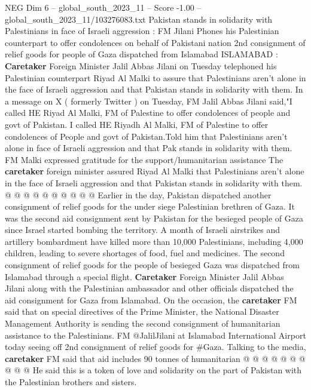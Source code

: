 \begin{textsample}{NEG Dim 6 – global\_south\_2023\_11 – Score -1.00 – global\_south\_2023\_11/103276083.txt}  \label{ex:f6_neg_151}
Pakistan stands in solidarity with Palestinians in face of Israeli aggression : FM Jilani Phones his Palestinian counterpart to offer condolences on behalf of Pakistani nation 2nd consignment of relief goods for people of Gaza dispatched from Islamabad ISLAMABAD : \textbf{Caretaker} Foreign Minister Jalil Abbas Jilani on Tuesday telephoned his Palestinian counterpart Riyad Al Malki to assure that Palestinians aren't alone in the face of Israeli aggression and that Pakistan stands in solidarity with them.
In a message on X ( formerly Twitter ) on Tuesday, FM Jalil Abbas Jilani said,"I called HE Riyad Al Malki, FM of Palestine to offer condolences of people and govt of Pakistan.
I called HE Riyadh Al Malki, FM of Palestine to offer condolences of People and govt of Pakistan.Told him that Palestinians aren't alone in face of Israeli aggression and that Pak stands in solidarity with them.
FM Malki expressed gratitude for the support/humanitarian assistance The \textbf{caretaker} foreign minister assured Riyad Al Malki that Palestinians aren't alone in the face of Israeli aggression and that Pakistan stands in solidarity with them. @ @ @ @ @ @ @ @ @ @ Earlier in the day, Pakistan dispatched another consignment of relief goods for the under siege Palestinian brethren of Gaza.
It was the second aid consignment sent by Pakistan for the besieged people of Gaza since Israel started bombing the territory.
A month of Israeli airstrikes and artillery bombardment have killed more than 10,000 Palestinians, including 4,000 children, leading to severe shortages of food, fuel and medicines.
The second consignment of relief goods for the people of besieged Gaza was dispatched from Islamabad through a special flight. \textbf{Caretaker} Foreign Minister Jalil Abbas Jilani along with the Palestinian ambassador and other officials dispatched the aid consignment for Gaza from Islamabad.
On the occasion, the \textbf{caretaker} FM said that on special directives of the Prime Minister, the National Disaster Management Authority is sending the second consignment of humanitarian assistance to the Palestinians.
FM @JalilJilani at Islamabad International Airport today seeing off 2nd consignment of relief goods for \#Gaza.
Talking to the media, \textbf{caretaker} FM said that aid includes 90 tonnes of humanitarian @ @ @ @ @ @ @ @ @ @ He said this is a token of love and solidarity on the part of Pakistan with the Palestinian brothers and sisters.

\end{textsample}
